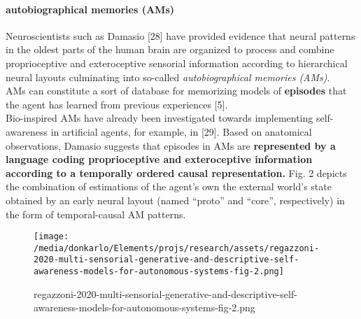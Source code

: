 \documentclass{article}
\begin{document}
			\paragraph{autobiographical memories (AMs)} Neuroscientists such as Damasio \citet{regazzoni-2020-multi-sensorial-generative-and-descriptive-self-awareness-models-for-autonomous-systems}[28] have provided evidence that neural patterns in the oldest parts of the human brain are organized to process and combine proprioceptive and exteroceptive sensorial information according to hierarchical neural layouts culminating into so-called \emph{autobiographical memories (AMs)}. 
			\\
			AMs can constitute a sort of database for memorizing models of \textbf{episodes} that the agent has learned from previous experiences \citet{regazzoni-2020-multi-sensorial-generative-and-descriptive-self-awareness-models-for-autonomous-systems}[5]. 
			\\
			Bio-inspired AMs have already been investigated towards implementing self-awareness in
			artificial agents, for example, in \citet{regazzoni-2020-multi-sensorial-generative-and-descriptive-self-awareness-models-for-autonomous-systems}[29]. Based on anatomical observations, Damasio suggests that episodes in AMs are \textbf{represented by a language coding proprioceptive and exteroceptive information according to a temporally ordered causal representation.} Fig. 2 depicts the combination of estimations
			of the agent’s own the external world’s state obtained by an
			early neural layout (named “proto” and “core”, respectively)
			in the form of temporal-causal AM patterns.
			\begin{figure*}
				\centering
				\texttt{[image: /media/donkarlo/Elements/projs/research/assets/regazzoni-2020-multi-sensorial-generative-and-descriptive-self-awareness-models-for-autonomous-systems-fig-2.png]}
				\caption{regazzoni-2020-multi-sensorial-generative-and-descriptive-self-awareness-models-for-autonomous-systems-fig-2.png}
				\label{fig:regazzoni-2020-multi-sensorial-generative-and-descriptive-self-awareness-models-for-autonomous-systems-fig-2.png}
			\end{figure*}
\end{document}
